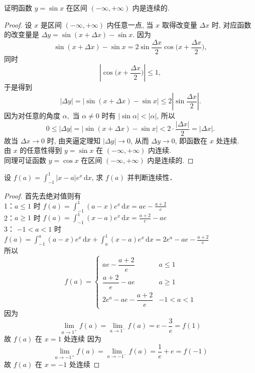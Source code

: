 \documentclass[color=green,titlestyle=hang]{elegantbook}%
\begin{document}
\begin{example}
证明函数 $y=\sin x$ 在区间 $(-\infty,+\infty)$ 内是连续的.	
\end{example}\begin{proof}
设 $x$ 是区间 $(-\infty,+\infty)$ 内任意一点, 当 $x$ 取得改变量 $\Delta x$ 时, 对应函数的改变量是
$\Delta y=\sin(x+\Delta x)-\sin x.$
因为
$$\sin(x+\Delta x)-\sin x=2\sin\frac{\Delta x}{2}\cos\Big (x+\frac{\Delta x}{2}\Big),$$
同时
$$\left|\cos\Big (x+\frac{\Delta x}{2}\Big)\right|\leqslant 1,$$
于是得到
$$|\Delta y|=|\sin(x+\Delta x)-\sin x|\leqslant 2\left|\sin\frac{\Delta x}{2}\right|.$$
因为对任意的角度 $\alpha,$ 当 $\alpha\ne 0$ 时有 $|\sin \alpha|<|\alpha|$, 所以
$$0\leqslant |\Delta y|=|\sin(x+\Delta x)-\sin x|<2\cdot \frac{|\Delta x|}{2}=|\Delta x|.$$
故当 $\Delta x\to 0$ 时, 由夹逼定理知 $|\Delta y|\to 0$, 从而  $\Delta y\to 0$, 即函数在 $x$ 处连续. \\
由 $x$ 的任意性得到 $y=\sin x$ 在 $(-\infty,+\infty)$ 内连续.\\
同理可证函数 $y=\cos x$ 在区间 $(-\infty,+\infty)$ 内是连续的.	
\end{proof}

\begin{example}
设 $\displaystyle f(a)=\int_{-1}^{1}|x-a|e^x\,\mathrm{d}x$, 求 $f(a)$ 并判断连续性．	
\end{example}\begin{proof}
首先去绝对值则有\\[1mm]
1：$a\leqslant1$  时 $\displaystyle f(a)=\int_{-1}^{1}(a-x)e^x\,\mathrm{d}x=ae-\frac{a+2}{e}$\\[1mm]
2：$a\geqslant1$  时 $\displaystyle f(a)=\int_{-1}^{1}(x-a)e^x\,\mathrm{d}x=\frac{a+2}{e}-ae$\\[1mm]
3： $-1<a<1$ 时$\displaystyle f(a)=\int_{-1}^{a}(a-x)e^x\,\mathrm{d}x+\int_{a}^{1}(x-a)e^x\,\mathrm{d}x=2e^a-ae-\frac{a+2}{e}$\\[1mm]
所以\begin{equation*}f(a)=\begin{cases}ae-\dfrac{a+2}{e}&a\leqslant1\\[1mm]
\dfrac{a+2}{e}-ae&a\geqslant1\\[1mm]
2e^a-ae-\dfrac{a+2}{e}&-1<a<1
\end{cases}\end{equation*}
因为\begin{equation*}\lim_{a\to1^+}f(a)=\lim_{a\to1^-}f(a)=e-\frac{3}{e}=f(1)\end{equation*}
故 $f(a)$ 在 $x=1$ 处连续
因为\begin{equation*}\lim_{a\to-1^+}f(a)=\lim_{a\to-1^-}f(a)=\frac{1}{e}+e=f(-1)\end{equation*}
故 $f(a)$ 在 $x=-1$ 处连续	
\end{proof}
\end{document}
